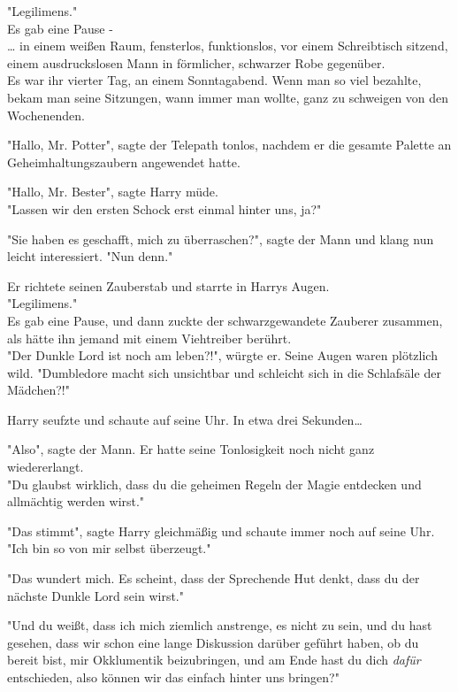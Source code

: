 {"Legilimens."\\ Es gab eine Pause -\\ … in einem weißen Raum, fensterlos, funktionslos, vor einem Schreibtisch sitzend, einem ausdruckslosen Mann in förmlicher, schwarzer Robe gegenüber.\\ Es war ihr vierter Tag, an einem Sonntagabend. Wenn man so viel bezahlte, bekam man seine Sitzungen, wann immer man wollte, ganz zu schweigen von den Wochenenden.

"Hallo, Mr. Potter", sagte der Telepath tonlos, nachdem er die gesamte Palette an Geheimhaltungszaubern angewendet hatte.

"Hallo, Mr. Bester", sagte Harry müde.\\ "Lassen wir den ersten Schock erst einmal hinter uns, ja?"

"Sie haben es geschafft, mich zu überraschen?", sagte der Mann und klang nun leicht interessiert. "Nun denn."

Er richtete seinen Zauberstab und starrte in Harrys Augen.\\ "Legilimens."\\ Es gab eine Pause, und dann zuckte der schwarzgewandete Zauberer zusammen, als hätte ihn jemand mit einem Viehtreiber berührt.\\ "Der Dunkle Lord ist noch am leben?!", würgte er. Seine Augen waren plötzlich wild. "Dumbledore macht sich unsichtbar und schleicht sich in die Schlafsäle der Mädchen?!"

Harry seufzte und schaute auf seine Uhr. In etwa drei Sekunden…

"Also", sagte der Mann. Er hatte seine Tonlosigkeit noch nicht ganz wiedererlangt.\\ "Du glaubst wirklich, dass du die geheimen Regeln der Magie entdecken und allmächtig werden wirst."

"Das stimmt", sagte Harry gleichmäßig und schaute immer noch auf seine Uhr.\\ "Ich bin so von mir selbst überzeugt."

"Das wundert mich. Es scheint, dass der Sprechende Hut denkt, dass du der nächste Dunkle Lord sein wirst."

"Und du weißt, dass ich mich ziemlich anstrenge, es nicht zu sein, und du hast gesehen, dass wir schon eine lange Diskussion darüber geführt haben, ob du bereit bist, mir Okklumentik beizubringen, und am Ende hast du dich \emph{dafür} entschieden, also können wir das einfach hinter uns bringen?"

}
